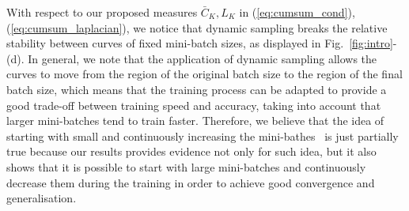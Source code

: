 \documentclass[10pt,journal,compsoc]{IEEEtran}
\begin{document}
With respect to our proposed measures $\bar{C}_K,L_K$ in (\ref{eq:cumsum_cond}),(\ref{eq:cumsum_laplacian}), we notice that dynamic sampling breaks the relative stability between curves of fixed mini-batch sizes, as displayed in Fig.~\ref{fig:intro}-(d).  In general, we note that the application of dynamic sampling allows the curves to move from the region of the original batch size to the region of the final batch size, which means that the training process can be adapted to provide a good trade-off between training speed and accuracy, taking into account that larger mini-batches tend to train faster.  Therefore, we believe that the idea of starting with small and continuously increasing the mini-bathes~\cite{friedlander2012hybrid, byrd2012sample} is just partially true because our results provides evidence not only for such idea, but it also shows that it is possible to start with large mini-batches and continuously decrease them during the training in order to achieve good convergence and generalisation.
\end{document}
